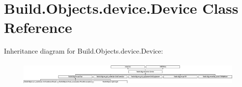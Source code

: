 \hypertarget{class_build_1_1_objects_1_1device_1_1_device}{}\section{Build.\+Objects.\+device.\+Device Class Reference}
\label{class_build_1_1_objects_1_1device_1_1_device}
Inheritance diagram for Build.\+Objects.\+device.\+Device\+:\begin{figure}[H]
\begin{center}
\leavevmode
\includegraphics[height=1.204301cm]{class_build_1_1_objects_1_1device_1_1_device}
\end{center}
\end{figure}
